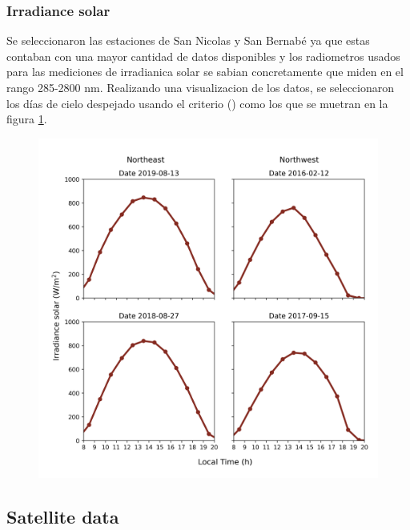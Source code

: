 \subsubsection{Irradiance solar}
Se seleccionaron las estaciones de San Nicolas y San Bernabé ya que estas contaban con una mayor cantidad de datos disponibles
y los radiometros usados para las mediciones de irradianica solar se sabian concretamente que miden en el rango 285-2800 nm.
Realizando una visualizacion de los datos, se seleccionaron los días de cielo despejado usando el criterio ()
como los que se muetran en la figura \ref{fig:clear_days}.
\begin{figure}[H]
    \centering
    \includegraphics[scale=0.5]{images/Clear_days.png}
    \caption{}
    \label{fig:clear_days}
\end{figure}
\subsection{Satellite data}
